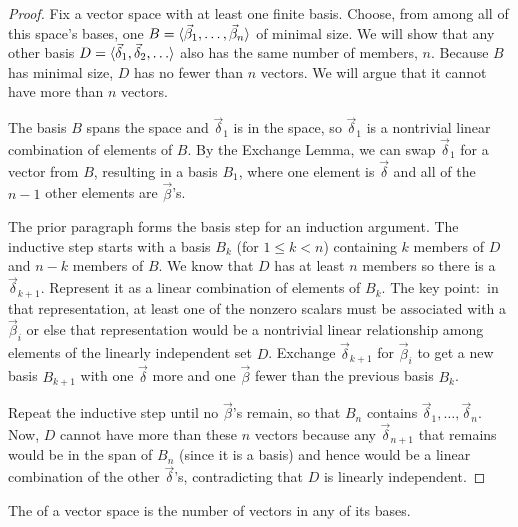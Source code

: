 \begin{proof}
Fix a vector space with at least one finite basis.
Choose, from among all of this space's bases,
one \( B=\langle\vec{\beta}_1,\dots,\vec{\beta}_n\rangle \) of minimal size.
We will show that any other basis
\( D=\smash{\langle\vec{\delta}_1,\vec{\delta}_2,\ldots\rangle} \)
also has the same number of members, $n$.
Because \( B \) has minimal size, \( D \) has no fewer than \( n \) vectors.
We will argue that it cannot have more than \( n \) vectors.

The basis \( B \) spans the space and \( \vec{\delta}_1 \) is in the space,
so \( \vec{\delta}_1 \) is a nontrivial linear combination of elements of
\( B \).
By the Exchange Lemma, we can swap \( \vec{\delta}_1 \) for a
vector from \( B \), resulting in a basis \( B_1 \), where one element is
\( \vec{\delta} \) and all of the \( n-1 \) other elements 
are \( \vec{\beta} \)'s.

The prior paragraph forms the basis step for an induction argument.
The inductive step starts with a basis \( B_k \) (for \( 1\leq k<n \))
containing \( k \) members of \( D \) and \( n-k \) members of \( B \).
We know that \( D \) has at least \( n \) members so there is a
\( \vec{\delta}_{k+1} \).
Represent it as a linear combination of elements of \( B_k \).
The key point:~in that representation, at least one of the nonzero scalars
must be associated with a \( \vec{\beta}_i \) or else that
representation would be a
nontrivial linear relationship among elements of the linearly independent
set \( D \).
Exchange \( \vec{\delta}_{k+1} \) for \( \vec{\beta}_i \) to get a new basis
\( B_{k+1} \) with one \( \vec{\delta} \) more and one \( \vec{\beta} \)
fewer than the previous basis \( B_k \).

Repeat the inductive step until no \( \vec{\beta} \)'s remain, so
that \( B_n \) contains  
$\vec{\delta}_1,\dots,\vec{\delta}_n$.
Now, \( D \) cannot have more than these \( n \) vectors because
any \( \vec{\delta}_{n+1} \) that remains would be in the span of
\( B_n \) (since it is a basis) 
and hence would be a linear combination of the other $\vec{\delta}$'s, 
contradicting that $D$ is linearly independent.
\end{proof}

\begin{definition}
The 
of a vector space is the number of vectors in any of its bases.
\end{definition}

